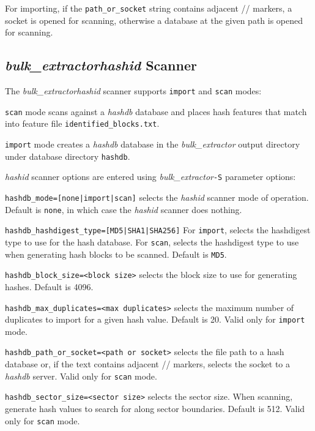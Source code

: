 \documentclass[12pt,twoside]{article}
\newcommand{\hdb}{\emph{hashdb}\xspace}
\newcommand{\bulk}{\emph{bulk\_extractor}\xspace}
\newcommand{\hid}{\emph{hashid}\xspace}
\begin{document}
For importing, if the \texttt{path\_or\_socket} string
contains adjacent // markers, a socket is opened for scanning,
otherwise a database at the given path is opened for scanning.


%

\subsection{\bulk \hid Scanner}
The \bulk \hid scanner supports \texttt{import} and \texttt{scan} modes:
\begin{compactitem}
\item \texttt{scan} mode scans against a \hdb database
and places hash features that match into feature file \texttt{identified\_blocks.txt}.
\item \texttt{import} mode creates a \hdb database
in the \bulk output directory under database directory \texttt{hashdb}.
\end{compactitem}

\hid scanner options are entered using \bulk \texttt{-S} parameter options:
\begin{compactitem}
\item \texttt{hashdb\_mode=[none|import|scan]}
selects the \hid scanner mode of operation.
Default is \texttt{none}, in which case the \hid scanner does nothing.
\item \texttt{hashdb\_hashdigest\_type=[MD5|SHA1|SHA256]}
For \texttt{import}, selects the hashdigest type to use for the hash database.
For \texttt{scan}, selects the hashdigest type to use
when generating hash blocks to be scanned.
Default is \texttt{MD5}.
\item \texttt{hashdb\_block\_size=<block size>}
selects the block size to use for generating hashes.
Default is 4096.
\item \texttt{hashdb\_max\_duplicates=<max duplicates>}
selects the maximum number of duplicates to import for a given hash value.
Default is 20.
Valid only for \texttt{import} mode.
\item \texttt{hashdb\_path\_or\_socket=<path or socket>}
selects the file path to a hash database
or, if the text contains adjacent // markers,
selects the socket to a \hdb server.
Valid only for \texttt{scan} mode.
\item \texttt{hashdb\_sector\_size=<sector size>}
selects the sector size.
When scanning, generate hash values to search for along sector boundaries.
Default is 512.
Valid only for \texttt{scan} mode.
\end{compactitem}
\end{document}

